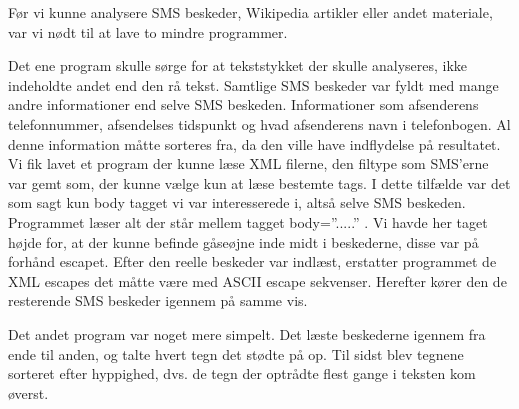 \label{SmaaProg}
Før vi kunne analysere SMS beskeder, Wikipedia artikler eller andet materiale, var vi nødt til at lave to mindre programmer.

Det ene program skulle sørge for at tekststykket der skulle analyseres, ikke indeholdte andet end den rå tekst. Samtlige SMS beskeder var fyldt med mange andre informationer end selve SMS beskeden. Informationer som afsenderens telefonnummer, afsendelses tidspunkt og hvad afsenderens navn i telefonbogen. Al denne information måtte sorteres fra, da den ville have indflydelse på resultatet. Vi fik lavet et program der kunne læse XML filerne, den filtype som SMS’erne var gemt som, der kunne vælge kun at læse bestemte tags. I dette tilfælde var det som sagt kun body tagget vi var interesserede i, altså selve SMS beskeden. Programmet læser alt der står mellem tagget body=”.....” . Vi havde her taget højde for, at der kunne befinde gåseøjne inde midt i beskederne, disse var på forhånd escapet. Efter den reelle beskeder var indlæst, erstatter programmet de XML escapes det måtte være med ASCII escape sekvenser. Herefter kører den de resterende SMS beskeder igennem på samme vis.

Det andet program var noget mere simpelt. Det læste beskederne igennem fra ende til anden, og talte hvert tegn det stødte på op. Til sidst blev tegnene sorteret efter hyppighed, dvs. de tegn der optrådte flest gange i teksten kom øverst.